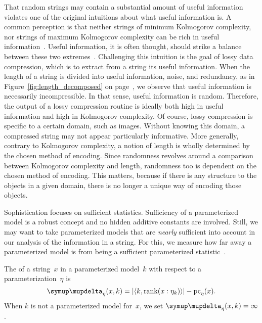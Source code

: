That random strings may contain a substantial amount of useful information violates one of the original intuitions about what useful information is.
A common perception is that neither strings of minimum Kolmogorov complexity, nor strings of maximum Kolmogorov complexity can be rich in useful information~\parencite{adriaans2012facticity}.
Useful information, it is often thought, should strike a balance between these two extremes~\parencite{vitanyi2006meaningful,adriaans2012facticity}.
Challenging this intuition is the goal of lossy data compression, which is to extract from a string its useful information.
When the length of a string is divided into useful information, noise, and redundancy, as in Figure~\ref{fig:length_decomposed} on page~\pageref{fig:length_decomposed}, we observe that useful information is necessarily incompressible.
In that sense, useful information is random.
Therefore, the output of a lossy compression routine is ideally both high in useful information and high in Kolmogorov complexity.
Of course, lossy compression is specific to a certain domain, such as images.
Without knowing this domain, a compressed string may not appear particularly informative.
More generally, contrary to Kolmogorov complexity, a notion of length is wholly determined by the chosen method of encoding.
Since randomness revolves around a comparison between Kolmogorov complexity and length, randomness too is dependent on the chosen method of encoding.
This matters, because if there is any structure to the objects in a given domain, there is no longer a unique way of encoding those objects.
\slogan[\label{slo:random_object}]{There is no such thing as a random object unless the object is a string and nothing but a string.}

Sophistication focuses on sufficient statistics.
Sufficiency of a parameterized model is a robust concept and no hidden additive constants are involved.
Still, we may want to take parameterized models that are \emph{nearly} sufficient into account in our analysis of the information in a string.
For this, we measure how far away a parameterized model is from being a sufficient parameterized statistic~\parencite{vereshchagin2017algorithmic}.
\begin{definition}
\label{def:deficiency}%
  The  of a string~$x$ in a parameterized model~$k$ with respect to a parameterization~$\eta$ is
  \begin{equation*}
    \updelta_\eta(x, k) \deq \length{\pair{k}{\rank(x : \eta_k)}} - \pc_\eta(x).
  \end{equation*}
  When $k$ is not a parameterized model for~$x$, we set $\updelta_\eta(x, k) \deq \infty$.
\end{definition}

